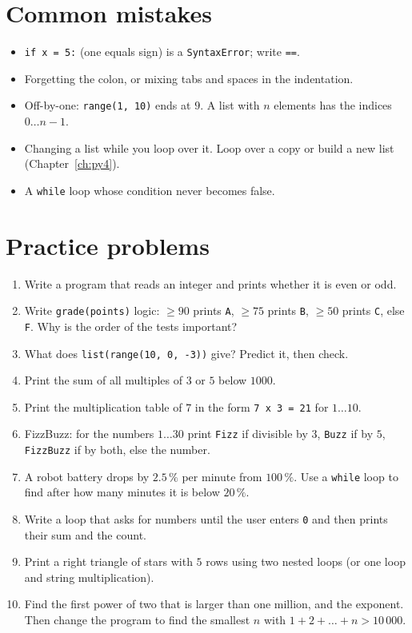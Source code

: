 \section*{Common mistakes}
\begin{itemize}[nosep]
  \item \verb!if x = 5:! (one equals sign) is a \texttt{SyntaxError}; write \texttt{==}.
  \item Forgetting the colon, or mixing tabs and spaces in the indentation.
  \item Off-by-one: \texttt{range(1, 10)} ends at $9$. A list with $n$ elements has the indices $0\dots n-1$.
  \item Changing a list while you loop over it. Loop over a copy or build a new list (Chapter~\ref{ch:py4}).
  \item A \texttt{while} loop whose condition never becomes false.
\end{itemize}

\section*{Practice problems}
\begin{enumerate}[label=\textbf{\thechapter.\arabic*}]
  \item Write a program that reads an integer and prints whether it is even or odd.
  \item Write \texttt{grade(points)} logic: $\geq 90$ prints \texttt{A}, $\geq 75$ prints \texttt{B}, $\geq 50$ prints \texttt{C}, else \texttt{F}. Why is the order of the tests important?
  \item What does \texttt{list(range(10, 0, -3))} give? Predict it, then check.
  \item Print the sum of all multiples of $3$ or $5$ below $1000$.
  \item Print the multiplication table of $7$ in the form \texttt{7 x 3 = 21} for $1\dots10$.
  \item FizzBuzz: for the numbers $1\dots30$ print \texttt{Fizz} if divisible by $3$, \texttt{Buzz} if by $5$, \texttt{FizzBuzz} if by both, else the number.
  \item A robot battery drops by $2.5\,\%$ per minute from $100\,\%$. Use a \texttt{while} loop to find after how many minutes it is below $20\,\%$.
  \item Write a loop that asks for numbers until the user enters \texttt{0} and then prints their sum and the count.
  \item Print a right triangle of stars with $5$ rows using two nested loops (or one loop and string multiplication).
  \item[\textbf{\thechapter.10}$\star$] Find the first power of two that is larger than one million, and the exponent. Then change the program to find the smallest $n$ with $1+2+\dots+n>10\,000$.
\end{enumerate}
